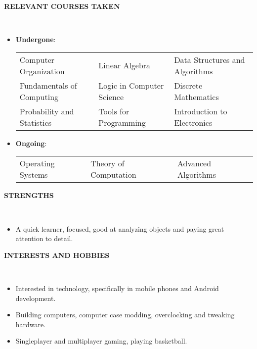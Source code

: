 \documentclass[a4paper,10pt]{article}
\newcommand{\isep}{-2 pt}
\newcommand{\lsep}{-0.5cm}
\newcommand{\resheading}[1]{{\small \colorbox{mygrey}{\begin{minipage}{0.975\textwidth}{\textbf{#1 \vphantom{p\^{E}}}}\end{minipage}}}}
\begin{document}
\resheading{\textbf{RELEVANT COURSES TAKEN} }\\[\lsep]
\begin{itemize}
\item \textbf{Undergone}:\\
\begin{tabular}{ L{6.7cm} L{6.7cm} L{6.7cm} }
Computer Organization & Linear Algebra & Data Structures and Algorithms\\
Fundamentals of Computing & Logic in Computer Science & Discrete Mathematics\\
Probability and Statistics & Tools for Programming & Introduction to Electronics
\end{tabular}

\item \textbf{Ongoing}:\\
\begin{tabular}{ L{6.7cm} L{6.7cm} L{6.7cm} }
Operating Systems & Theory of Computation & Advanced Algorithms\\
\end{tabular}
\end{itemize}

\resheading{\textbf{STRENGTHS} }\\[\lsep]
\begin{itemize}
\item \noindent A quick learner, focused, good at analyzing objects and paying great attention to detail.
\end{itemize}

\resheading{\textbf{INTERESTS AND HOBBIES} }\\[\lsep]
\begin{itemize}\itemsep\isep
\item \noindent Interested in technology, specifically in mobile phones and Android development.
\item \noindent Building computers, computer case modding, overclocking and tweaking hardware.
\item \noindent Singleplayer and multiplayer gaming, playing basketball.
\end{itemize}
\end{document}

